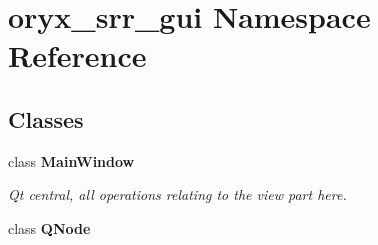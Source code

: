 \section{oryx\-\_\-srr\-\_\-gui \-Namespace \-Reference}
\label{namespaceoryx__srr__gui}
\subsection*{\-Classes}
\begin{DoxyCompactItemize}
\item 
class {\bf \-Main\-Window}
\begin{DoxyCompactList}\small\item\em \-Qt central, all operations relating to the view part here. \end{DoxyCompactList}\item 
class {\bf \-Q\-Node}
\end{DoxyCompactItemize}

